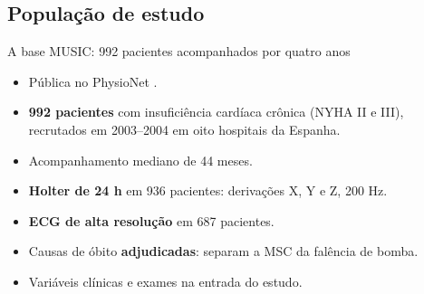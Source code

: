 \documentclass[10pt,aspectratio=169]{beamer}
\begin{document}
\subsection{População de estudo}

\begin{frame}{A base MUSIC: 992 pacientes acompanhados por quatro anos}
  \begin{itemize}
    \item Pública no PhysioNet \cite{martinyebra2025music, martinyebra2024music}.
    \item \textbf{992 pacientes} com insuficiência cardíaca crônica (NYHA II e
      III), recrutados em 2003--2004 em oito hospitais da Espanha.
    \item Acompanhamento mediano de 44 meses.
    \item \textbf{Holter de 24 h} em 936 pacientes: derivações X, Y e Z, 200 Hz.
    \item \textbf{ECG de alta resolução} em 687 pacientes.
    \item Causas de óbito \textbf{adjudicadas}: separam a MSC da falência de bomba.
    \item Variáveis clínicas e exames na entrada do estudo.
  \end{itemize}
\end{frame}
\end{document}
